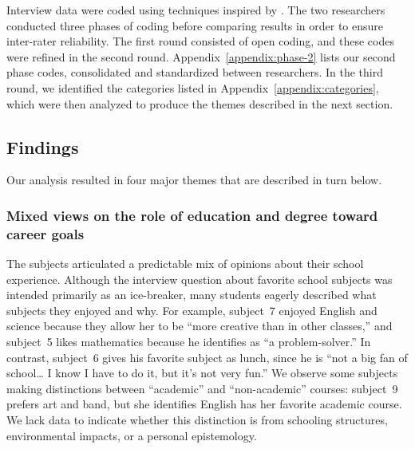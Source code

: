 \documentclass[letterpaper]{article}
\begin{document}
Interview data were coded using techniques inspired by
\citet{Saldana2009}. The two researchers conducted three phases 
of coding before comparing results in order to ensure inter-rater
reliability. The first round consisted of open coding, and these
codes were refined in the second round. 
Appendix~\ref{appendix:phase-2} lists our second phase codes,
consolidated and standardized between researchers.
In the third round, we identified the categories listed in
Appendix~\ref{appendix:categories}, which were then analyzed
to produce the themes described in the next section.

\subsection{Findings}

Our analysis resulted in four major themes that are described in turn below.

\newcommand{\theme}[1]{\subsubsection*{#1}}

\theme{Mixed views on the role of education and degree toward career goals}

The subjects articulated a predictable mix of opinions about their
school experience. Although the interview question about favorite
school subjects was intended primarily as an ice-breaker,
many students eagerly described what subjects they enjoyed and why.
For example, subject~7 enjoyed English and science because they allow her
to be ``more creative than in other classes,'' and subject~5 likes
mathematics because he identifies as ``a problem-solver.''
In contrast, subject~6 gives his favorite subject as lunch, 
since he is ``not a big
fan of school\ldots{} I know I have to do it, but it's not very fun.''
We observe some subjects making distinctions between ``academic'' and 
``non-academic'' courses: subject~9 prefers art and band, but she identifies
English has her favorite academic course. We lack data to indicate whether
this distinction is from schooling structures, environmental impacts, 
or a personal epistemology.
\end{document}
